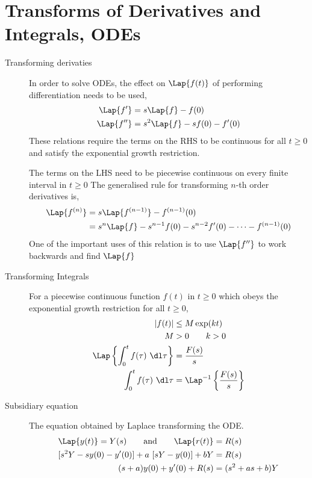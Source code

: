 \section{Transforms of Derivatives and Integrals, ODEs}
\begin{description}
    \item[Transforming derivaties] In order to solve ODEs, the effect on $ \Lap\{f(t)\} $
        of performing differentiation needs to be used,
        \begin{align}
            \Lap\{f'\}  & = s\Lap\{f\} - f(0)            \\
            \Lap\{f''\} & = s^2\Lap\{f\} - sf(0) - f'(0)
        \end{align}
        These relations require the terms on the RHS to be continuous for all $t \geq 0$
        and satisfy the exponential growth restriction. \par
        The terms on the LHS need to be piecewise continuous on every finite interval in
        $ t \geq 0 $
        The generalised rule for transforming $ n $-th order derivatives is,
        \begin{align}
            \Lap\{f^{(n)}\} & = s\Lap\{f^{(n-1)}\} - f^{(n-1)}(0)          \\
                            & = s^n \Lap\{f\} - s^{n-1}f(0) - s^{n-2}f'(0)
            - \dots - f^{(n-1)}(0)
        \end{align}
        One of the important uses of this relation is to use $ \Lap\{f''\} $ to
        work backwards and find $ \Lap\{f\} $

    \item[Transforming Integrals] For a piecewise continuous function $ f(t) $ in
        $ t \geq 0 $ which obeys the exponential growth restriction for all $ t \geq 0 $,
        \begin{align}
            |f(t)|                                          & \leq M\exp(kt)   \\
            M                                               & > 0 \qquad k > 0 \\
            \Lap\left\{ \int_0^t f(\tau)\ \dl \tau \right\} & = \frac{F(s)}{s} \\
            \int_0^t f(\tau)\ \dl \tau                      & =
            \Lap^{-1}\left\{ \frac{F(s)}{s} \right\}
        \end{align}

    \item[Subsidiary equation] The equation obtained by Laplace transforming the ODE.
        \begin{align}
            \Lap\{y(t)\} = Y(s)  \qquad \text{and}
            \qquad \Lap\{r(t)\}                           & = R(s)            \\
            [s^2 Y - sy(0) - y'(0)] + a\ [sY - y(0)] + bY & = R(s)            \\
            (s+a)y(0) + y'(0) + R(s)                      & = (s^2 + as + b)Y
        \end{align}


\end{description}
